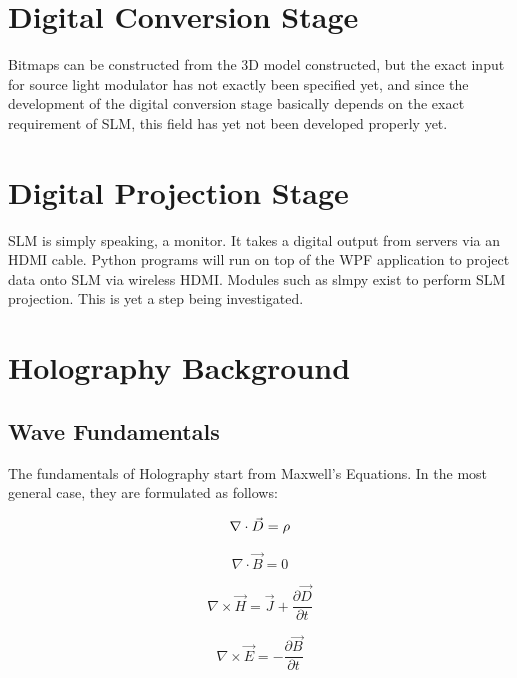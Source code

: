 \documentclass{article}
\begin{document}
\section{Digital Conversion Stage}

Bitmaps can be constructed from the 3D model constructed, but the exact input for source light modulator has not exactly been specified yet, and since the development of the digital conversion stage basically depends on the exact requirement of SLM, this field has yet not been developed properly yet.

\section{Digital Projection Stage}

SLM is simply speaking, a monitor. It takes a digital output from servers via an HDMI cable. Python programs will run on top of the WPF application to project data onto SLM via wireless HDMI. Modules such as slmpy exist to perform SLM projection. This is yet a step being investigated.

\section{Holography Background}

\subsection{Wave Fundamentals}

The fundamentals of Holography start from Maxwell's Equations. In the most general case, they are formulated as follows:

\begin{equation}
	\nabla \cdot \vec{D} = \rho\\
\end{equation}

\begin{equation}
	\nabla \cdot \vec{B} = 0
\end{equation}

\begin{equation}
	\nabla \times \vec{H} = \vec{J} + \frac{\partial \vec{D}}{\partial t}
\end{equation}

\begin{equation}
	\nabla \times \vec{E} = -\frac{\partial \vec{B}}{\partial t}
\end{equation}
\end{document}
